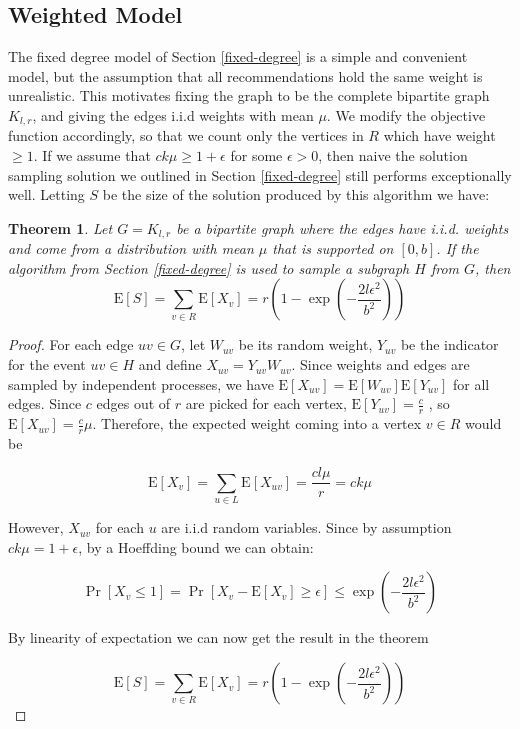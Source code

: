 \documentclass[11pt]{article}
\newcommand{\E}{\text{E}}
\newtheorem{thm}{Theorem}
\begin{document}
\subsection{Weighted Model}
\label{weighted}
The fixed degree model of Section \ref{fixed-degree} is a simple and
convenient model, but the assumption that all recommendations hold the
same weight is unrealistic. This motivates fixing the graph to be the
complete bipartite graph $K_{l,r}$, and giving the edges i.i.d weights
with mean $\mu$. We modify the objective function accordingly, so that
we count only the vertices in $R$ which have weight $\geq 1$. If we
assume that $ck\mu \geq 1+\epsilon$ for some $\epsilon > 0$, then 
naive the solution sampling solution we outlined in Section \ref{fixed-degree}
still performs exceptionally well. Letting $S$ be the size of the 
solution produced by this algorithm we have:

\begin{thm}
Let $G=K_{l,r}$ be a bipartite graph where the edges have i.i.d. weights and come from a distribution with mean $\mu$ that is supported on $[0,b]$. If the algorithm from Section \ref{fixed-degree} is used to sample a subgraph $H$ from $G$, then
\[ \E[S] = \sum_{v\in R} \E[X_v] = r\left(1-\exp\left(-\frac{2l\epsilon^2}{b^2}\right)\right) \]
\end{thm}

\begin{proof}
For each edge $uv\in G$, let $W_{uv}$ be its random weight, $Y_{uv}$ be
the indicator for the event $uv\in H$ and define $X_{uv} = Y_{uv}
W_{uv}$. Since weights and edges are sampled by independent processes,
we have $\E[X_{uv}] = \E[W_{uv}]\E[Y_{uv}]$ for all edges. Since $c$
edges out of $r$ are picked for each vertex, $\E[Y_{uv}] = \frac{c}{r}$
, so $\E[X_{uv}] = \frac{c}{r}\mu$. Therefore, the expected weight
coming into a vertex $v\in R$ would be 

\[ \E[X_v] = \sum_{u\in L} \E[X_{uv}] = \frac{cl\mu}{r} = ck\mu\]

However, $X_{uv}$ for each $u$ are i.i.d random variables. Since by
assumption $ck\mu = 1+\epsilon$, by a Hoeffding bound we can obtain:

\[ \Pr[X_v \leq 1] = \Pr[X_v - \E[X_v] \geq \epsilon] \leq \exp\left(-\frac{2l\epsilon^2}{b^2}\right) \]

By linearity of expectation we can now get the result in the theorem

\[ \E[S] = \sum_{v\in R} \E[X_v] = r\left(1-\exp\left(-\frac{2l\epsilon^2}{b^2}\right)\right) \]
\end{proof}
\end{document}
